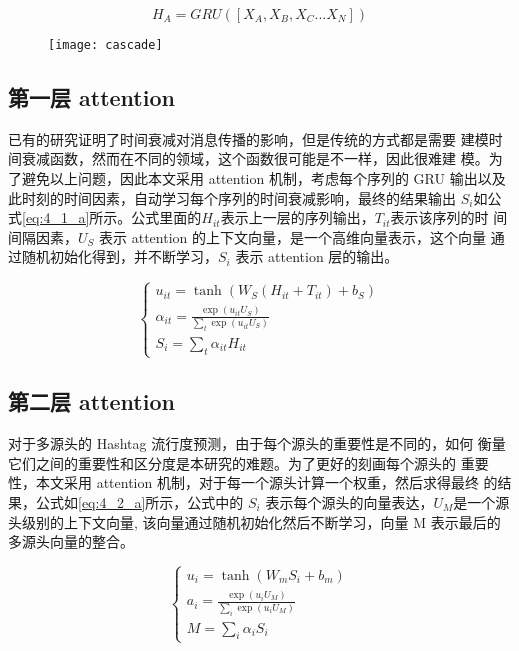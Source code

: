 \begin{equation}\label{eq:4_1_g}
H_A = GRU([X_A,X_B,X_C...X_N])
\end{equation}

\begin{figure}[H]
    \centering
    \texttt{[image: cascade]}
    \label{fig:cascade}
\end{figure}

\subsection{第一层 attention}
已有的研究证明了时间衰减对消息传播的影响，但是传统的方式都是需要 建模时间衰减函数，然而在不同的领域，这个函数很可能是不一样，因此很难建 模。为了避免以上问题，因此本文采用 attention 机制，考虑每个序列的 GRU 输出以及此时刻的时间因素，自动学习每个序列的时间衰减影响，最终的结果输出 $S_{i}$如公式\ref{eq:4_1_a}所示。公式里面的$H_{it}$表示上一层的序列输出，$T_{it}$表示该序列的时 间间隔因素，$U_{S}$ 表示 attention 的上下文向量，是一个高维向量表示，这个向量 通过随机初始化得到，并不断学习，$S_{i}$ 表示 attention 层的输出。

\begin{equation}\label{eq:4_1_a}
	\begin{cases}
	u_{it} = \tanh(W_S(H_{it}+T_{it}) +b_S)\\
	\alpha_{it} = \frac{\exp(u_{it}U_S)}{\sum_{t} \exp(u_{it}U_S)} \\
	S_i = \sum_{t}\alpha_{it} H_{it}
	\end{cases}
\end{equation}

\subsection{第二层 attention}

对于多源头的 Hashtag 流行度预测，由于每个源头的重要性是不同的，如何 衡量它们之间的重要性和区分度是本研究的难题。为了更好的刻画每个源头的 重要性，本文采用 attention 机制，对于每一个源头计算一个权重，然后求得最终 的结果，公式如\ref{eq:4_2_a}所示，公式中的 $S_{i}$ 表示每个源头的向量表达，$U_{M}$是一个源 头级别的上下文向量, 该向量通过随机初始化然后不断学习，向量 M 表示最后的 多源头向量的整合。

\begin{equation}\label{eq:4_2_a}
	\begin{cases}
	u_i = \tanh(W_mS_i +b_m)\\
	a_i = \frac{\exp(u_iU_M)}{\sum_{i} \exp(u_iU_M)} \\
	M = \sum_{i}\alpha_i S_i
	\end{cases}
\end{equation}

